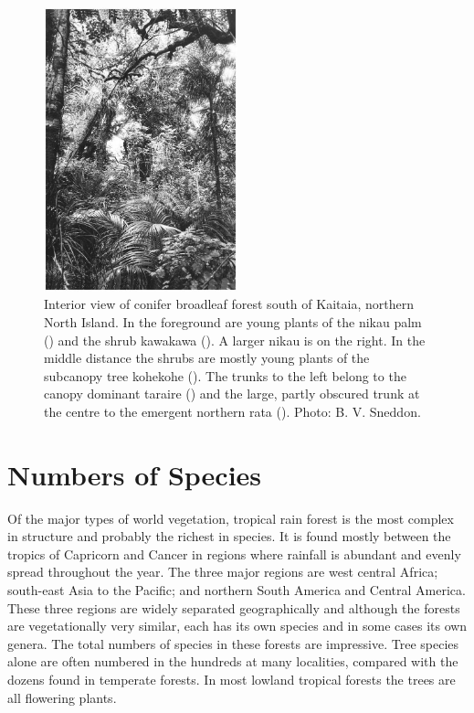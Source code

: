 \begin{figure}
	\includegraphics[width=0.5\textwidth]{graphics/figure8conifer.jpg}
	\centering
	\caption[Interior view of conifer broadleaf forest south of Kaitaia]{Interior view of conifer broadleaf forest south of Kaitaia, northern North Island.
	In the foreground are young plants of the nikau palm () and the shrub kawakawa ().
	A larger nikau is on the right.
	In the middle distance the shrubs are mostly young plants of the subcanopy tree kohekohe ().
	The trunks to the left belong to the canopy dominant taraire () and the large, partly obscured trunk at the centre to the emergent northern rata ().
	Photo: B. V. Sneddon.}%
	\label{fig:8conifer}
\end{figure}

\section{Numbers of Species}

Of the major types of world vegetation, tropical rain forest is the most complex in structure and probably the richest in species.
It is found mostly between the tropics of Capricorn and Cancer in regions where rainfall is abundant and evenly spread throughout the year.
The three major regions are west central Africa; south-east Asia to the Pacific; and northern South America and Central America.
These three regions are widely separated geographically and although the forests are vegetationally very similar, each has its own species and in some cases its own genera.
The total numbers of species in these forests are impressive.
Tree species alone are often numbered in the hundreds at many localities, compared with the dozens found in temperate forests.
In most lowland tropical forests the trees are all flowering plants.

